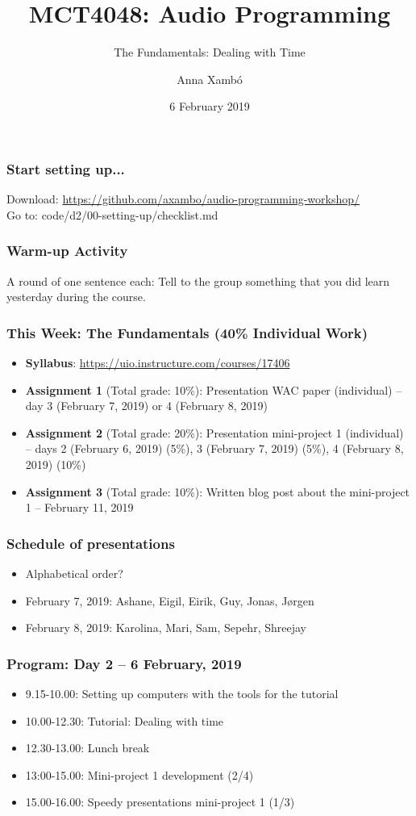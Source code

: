 \documentclass[screen, aspectratio=43]{beamer}
\title[AP-intro]{MCT4048: Audio Programming}
\subtitle{The Fundamentals: Dealing with Time}
\author[A. Xamb{\'o}]{Anna Xamb{\'o}}
\institute[NTNU]{Department of Music, NTNU}
\date{6 February 2019}
\begin{document}
\begin{frame}
  \titlepage
\end{frame}


%
\begin{frame}
\frametitle{Start setting up...}
Download: \url{https://github.com/axambo/audio-programming-workshop/} 
\\
\vspace{10 mm}
Go to: \textrm{code/d2/00-setting-up/checklist.md}
\end{frame}
%
\begin{frame}
\frametitle{Warm-up Activity}
A round of one sentence each: Tell to the group something that you did  learn yesterday during the course.
\end{frame}
%
\begin{frame}
\frametitle{This Week: The Fundamentals (40\% Individual Work)}
\begin{itemize}
\item \textbf{Syllabus}: \url{https://uio.instructure.com/courses/17406}
\item \textbf{Assignment 1} (Total grade: 10\%): Presentation WAC paper (individual) -- day 3 (February 7, 2019) or 4 (February 8, 2019)
\item \textbf{Assignment 2} (Total grade: 20\%): Presentation mini-project 1 (individual) -- days 2 (February 6, 2019) (5\%), 3 (February 7, 2019) (5\%), 4 (February 8, 2019) (10\%)
\item \textbf{Assignment 3} (Total grade: 10\%): Written blog post about the mini-project 1 -- February 11, 2019
\end{itemize}
\end{frame}
%
\begin{frame}
\frametitle{Schedule of presentations}
\begin{itemize}
\item Alphabetical order?
\item February 7, 2019: Ashane, Eigil, Eirik, Guy, Jonas, Jørgen
\item February 8, 2019: Karolina, Mari, Sam, Sepehr, Shreejay
\end{itemize}
\end{frame}
%
\begin{frame}
\frametitle{Program: Day 2 -- 6 February, 2019}
\begin{itemize}
\item 9.15-10.00: Setting up computers with the tools for the tutorial
\item 10.00-12.30: Tutorial: Dealing with time
\item 12.30-13.00: Lunch break
\item 13:00-15.00: Mini-project 1 development (2/4)
\item 15.00-16.00: Speedy presentations mini-project 1 (1/3)
\end{itemize}
\end{frame}
\end{document}
